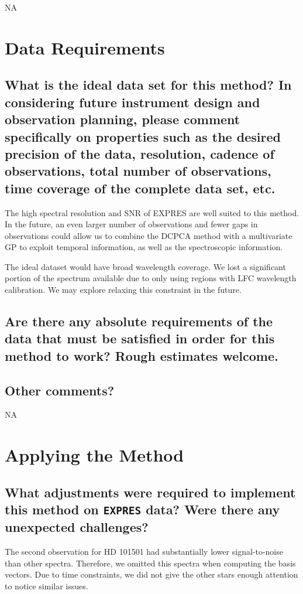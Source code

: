 \documentclass[12pt]{article}
\begin{document}
NA

\section{Data Requirements}
\subsection{What is the ideal data set for this method?  In considering future instrument design and observation planning, please comment specifically on properties such as the desired precision of the data, resolution, cadence of observations, total number of observations, time coverage of the complete data set, etc.}

The high spectral resolution and SNR of EXPRES are well suited to this method.  In the future, an even larger number of observations and fewer gaps in observations could allow us to combine the DCPCA method with a multivariate GP to exploit temporal information, as well as the spectroscopic information.

The ideal dataset would have broad wavelength coverage.
We lost a significant portion of the spectrum available due to only using regions with LFC wavelength calibration.
We may explore relaxing this constraint in the future.

\subsection{Are there any absolute requirements of the data that must be satisfied in order for this method to work?  Rough estimates welcome.}


\subsection{Other comments?}

NA

\section{Applying the Method}
\subsection{What adjustments were required to implement this method on \texttt{EXPRES} data?  Were there any unexpected challenges?}

The second observation for HD 101501 had substantially lower signal-to-noise than other spectra.
Therefore, we omitted this spectra when computing the basis vectors.
Due to time constraints, we did not give the other stars enough attention to notice similar issues.
\end{document}
